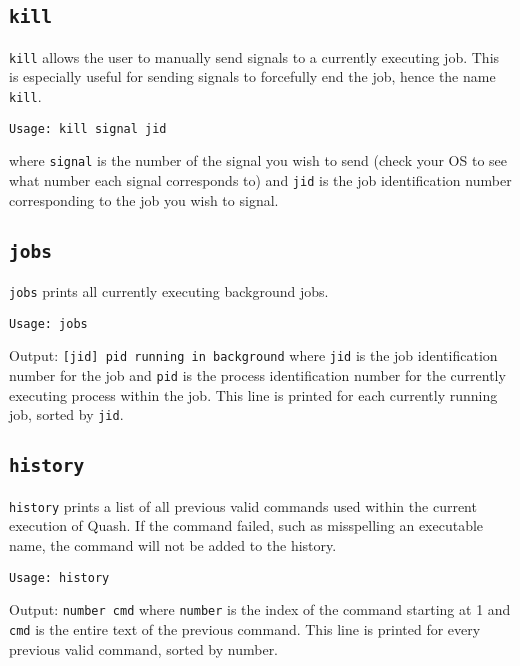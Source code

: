 \documentclass[12pt]{article}
\begin{document}
\subsection{\texttt{kill}}
\label{sec:orgad956c1}
\texttt{kill} allows the user to manually send signals to a currently executing
job. This is especially useful for sending signals to forcefully end the job,
hence the name \texttt{kill}.
\begin{verbatim}
Usage: kill signal jid
\end{verbatim}
where \texttt{signal} is the number of the signal you wish to send (check your OS to
see what number each signal corresponds to) and \texttt{jid} is the job identification
number corresponding to the job you wish to signal.
\subsection{\texttt{jobs}}
\label{sec:org910488c}
\texttt{jobs} prints all currently executing background jobs.
\begin{verbatim}
Usage: jobs
\end{verbatim}
Output: \texttt{[jid] pid running in background} where \texttt{jid} is the job identification
number for the job and \texttt{pid} is the process identification number for the
currently executing process within the job. This line is printed for each
currently running job, sorted by \texttt{jid}.
\subsection{\texttt{history}}
\label{sec:org4afe524}
\texttt{history} prints a list of all previous valid commands used within the current
execution of Quash. If the command failed, such as misspelling an executable
name, the command will not be added to the history.
\begin{verbatim}
Usage: history
\end{verbatim}
Output: \texttt{number cmd} where \texttt{number} is the index of the command starting
at 1 and \texttt{cmd} is the entire text of the previous command. This line is printed
for every previous valid command, sorted by number. 
\end{document}
